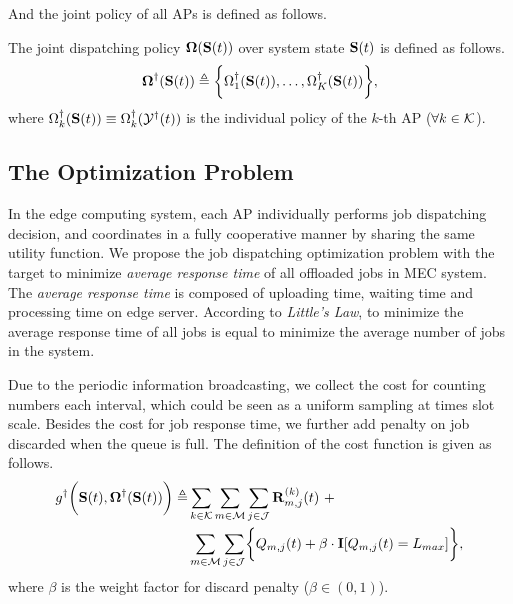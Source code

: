 And the joint policy of all APs is defined as follows.
\begin{definition}
    The joint dispatching policy $\boldsymbol{\Omega}(\mathbf{S}(t))$ over system state $\mathbf{S}(t)$ is defined as follows.
    \begin{align}
        \boldsymbol{\Omega}^{\dagger}(\mathbf{S}(t)) \triangleq \bigg\{
            \Omega^{\dagger}_{1}(\mathbf{S}(t)), \dots, \Omega^{\dagger}_{K}(\mathbf{S}(t))
        \bigg\},
    \end{align}
    where $\Omega^{\dagger}_{k}(\mathbf{S}(t)) \equiv \Omega^{\dagger}_{k}(\mathcal{Y}^{\dagger}(t))$
    is the individual policy of the $k$-th AP ($\forall k\in\mathcal{K}$).
\end{definition}

\subsection{The Optimization Problem}
In the edge computing system, each AP individually performs job dispatching decision, and coordinates in a fully cooperative manner by sharing the same utility function.
We propose the job dispatching optimization problem with the target to minimize \emph{average response time} of all offloaded jobs in MEC system.
The \emph{average response time} is composed of uploading time, waiting time and processing time on edge server.
According to \emph{Little's Law}, to minimize the average response time of all jobs is equal to minimize the average number of jobs in the system.

Due to the periodic information broadcasting, we collect the cost for counting numbers each interval, which could be seen as a uniform sampling at times slot scale.
Besides the cost for job response time, we further add penalty on job discarded when the queue is full.
The definition of the cost function is given as follows.
\begin{align}
    g^{\dagger}\Paren{\Stat(t), \Policy^{\dagger}(\Stat(t))} \define
        &\sum_{k\in\apSet} \sum_{m\in\esSet} \sum_{j\in\jSpace} \vec{R}^{(k)}_{m,j}(t)~+
        \nonumber\\
        &\sum_{m\in\esSet} \sum_{j\in\jSpace} \Brace{Q_{m,j}(t) + \beta \cdot \mat{I}[Q_{m,j}(t)=L_{max}]},
\end{align}
where $\beta$ is the weight factor for discard penalty ($\beta \in (0,1)$).

